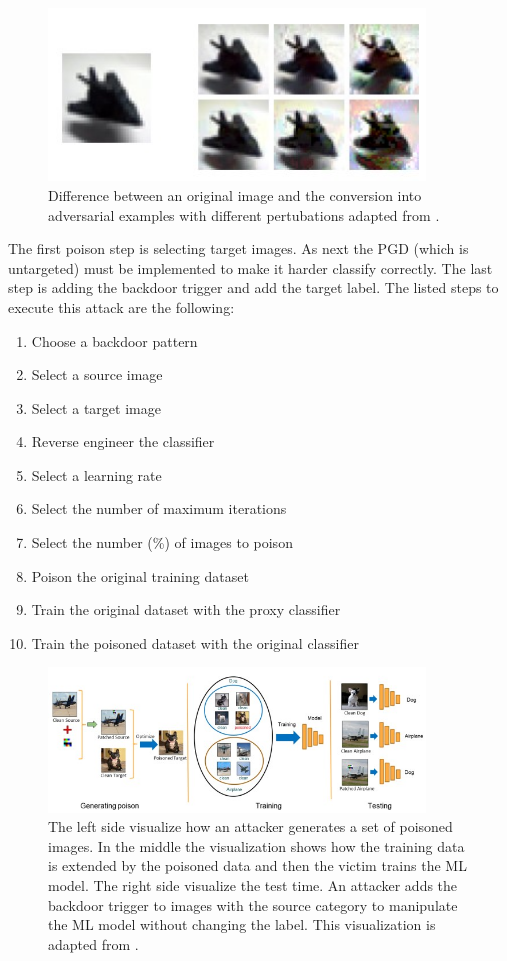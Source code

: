 \begin{figure}[ht!]
  \centering
  \includegraphics[width=10cm]{pictures/poisoned_clean_label.jpg}
  \caption{Difference between an original image and the conversion into adversarial examples with different pertubations adapted from \cite{turner2018clean}.}
  \label{fig:poisoned_clean_label}
\end{figure}

The first poison step is selecting target images. As next the PGD (which is untargeted)
must be implemented to make it harder classify correctly. The last step is adding the backdoor trigger and add the target label. The listed steps to execute this attack are the following:

\begin{enumerate}
 \item Choose a backdoor pattern
 \item Select a source image
 \item Select a target image
 \item Reverse engineer the classifier
 \item Select a learning rate
 \item Select the number of maximum iterations
 \item Select the number (\%) of images to poison
 \item Poison the original training dataset
 \item Train the original dataset with the proxy classifier
 \item Train the poisoned dataset with the original classifier
\end{enumerate}

\begin{figure}[ht!]
  \centering
  \includegraphics[width=10cm]{pictures/procedure_hidden_trigger.jpg}
  \caption{The left side visualize how an attacker generates a set of poisoned images. In the middle the visualization shows how the training data is extended by the poisoned data and then the victim trains the ML model. The right side visualize the test time. An attacker adds the backdoor trigger to images with the source category to manipulate the ML model without changing the label. This visualization is adapted from \cite{DBLP:journals/corr/abs-1910-00033}.}
  \label{fig:procedure_hidden_trigger}
\end{figure}

